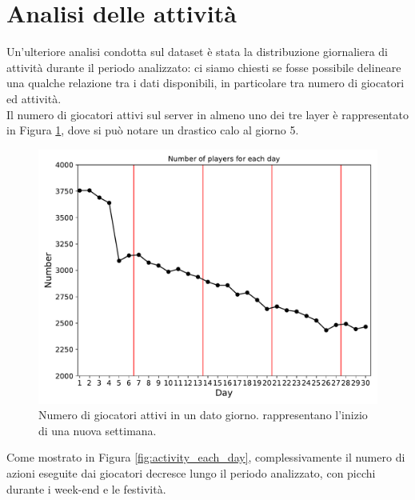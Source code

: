 \newpage 
\section{Analisi delle attività}
Un'ulteriore analisi condotta sul dataset è stata la distribuzione giornaliera di attività durante il periodo analizzato: ci siamo chiesti se fosse possibile delineare una qualche relazione tra i dati disponibili, in particolare tra numero di giocatori ed attività.\\
Il numero di giocatori attivi sul server in almeno uno dei tre layer è rappresentato in Figura \ref{fig:playereachday}, dove si può notare un drastico calo al giorno 5.
\begin{figure}
	\centering
	\includegraphics[width=0.8\linewidth]{images/Activity/player_each_day}
	\caption{Numero di giocatori attivi in un dato giorno. rappresentano l'inizio di una nuova settimana.}
	\label{fig:playereachday}
\end{figure}
Come mostrato in Figura \ref{fig:activity_each_day}, complessivamente il numero di azioni eseguite dai giocatori decresce lungo il periodo analizzato, con picchi durante i week-end e le festività. 
